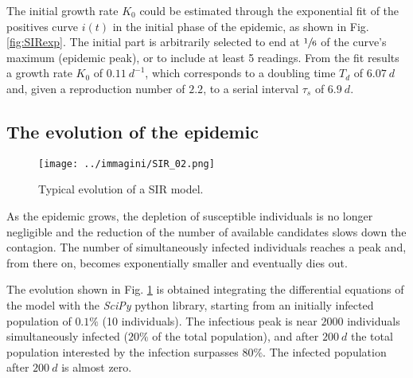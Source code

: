 \documentclass[DIV=12, BCOR=0pt]{scrartcl}  %
\begin{document}
	The initial growth rate $K_{0}$ could be estimated through the exponential fit of the positives curve $i(t)$ in the initial phase of the epidemic, as shown in Fig. \ref{fig:SIRexp}. The initial part is arbitrarily selected to end at $\sfrac{1}{6}$ of the curve's maximum (epidemic peak), or to include at least 5 readings. From the fit results a growth rate $K_{0}$ of $0.11 \ d^{-1}$, which corresponds to a doubling time $T_{d}$ of $6.07 \ d$ and, given a reproduction number of $2.2$, to a serial interval $\tau_{s}$ of $6.9 \ d$.

  \subsection{The evolution of the epidemic}
  
  \begin{figure}[h!]
  	\centering
  	\texttt{[image: ../immagini/SIR\_02.png]}
  	\caption{Typical evolution of a SIR model. }
  	\label{fig:SIRtot}
  \end{figure}

  As the epidemic grows, the depletion of susceptible individuals is no longer negligible and the reduction of the number of available candidates slows down the contagion. The number of simultaneously infected individuals reaches a peak and, from there on, becomes exponentially smaller and eventually dies out.
  
  The evolution shown in Fig. \ref{fig:SIRtot} %
  is obtained integrating the differential equations of the model with the \textit{SciPy} python library, starting from an initially infected population of $0.1 \%$ (10 individuals). The infectious peak is near $2000$ individuals simultaneously infected ($20 \%$ of the total population), and after $200 \ d$ the total population interested by the infection surpasses $80 \%$. The infected population after $200 \ d$ is almost zero. \\
  
  
  
\end{document}
